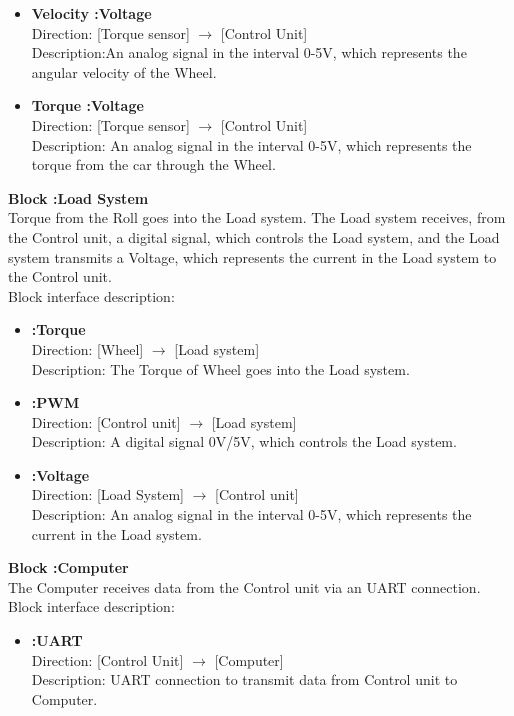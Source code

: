 \begin{itemize}
	\item \textbf{Velocity :Voltage}\\
		Direction: [Torque sensor] $\rightarrow$ [Control Unit]\\
		Description:An analog signal in the interval 0-5V, which represents the angular velocity of the Wheel.
	\item \textbf{Torque :Voltage}\\
		Direction: [Torque sensor] $\rightarrow$ [Control Unit]\\
		Description: An analog signal in the interval 0-5V, which represents the torque from the car through the Wheel.
\end{itemize}

\textbf{Block :Load System}\\
Torque from the Roll goes into the Load system. The Load system receives, from the Control unit, a digital signal, which controls the Load system, and the Load system transmits a Voltage, which represents the current in the Load system to the Control unit.\\
Block interface description:

\begin{itemize}
	\item \textbf{:Torque}\\
		Direction: [Wheel] $\rightarrow$ [Load system]\\
		Description: The Torque of Wheel goes into the Load system.
	\item \textbf{:PWM}\\
		Direction: [Control unit] $\rightarrow$ [Load system]\\
		Description: A digital signal 0V/5V, which controls the Load system.
	\item \textbf{:Voltage}\\
		Direction: [Load System] $\rightarrow$ [Control unit]\\
		Description: An analog signal in the interval 0-5V, which represents the current in the Load system.
\end{itemize}

\textbf{Block :Computer}\\
The Computer receives data from the Control unit via an UART connection.\\
Block interface description:

\begin{itemize}
	\item \textbf{:UART}\\
		Direction: [Control Unit] $\rightarrow$ [Computer]\\
		Description: UART connection to transmit data from Control unit to Computer.
\end{itemize}

